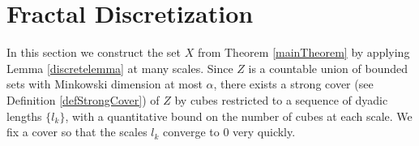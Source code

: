\documentclass[dvipsnames,letterpaper,12pt]{article}
\numberwithin{equation}{section}
\theoremstyle{plain}
\theoremstyle{remark}
\begin{document}
\section{Fractal Discretization}\label{discretizationsection}

In this section we construct the set $X$ from Theorem \ref{mainTheorem} by applying Lemma \ref{discretelemma} at many scales. Since $Z$ is a countable union of bounded sets with Minkowski dimension at most $\alpha$, there exists a strong cover (see Definition \ref{defStrongCover}) of $Z$ by cubes restricted to a sequence of dyadic lengths $\{ l_k \}$, with a quantitative bound on the number of cubes at each scale. We fix a cover so that the scales $l_k$ converge to $0$ very quickly.
\end{document}
